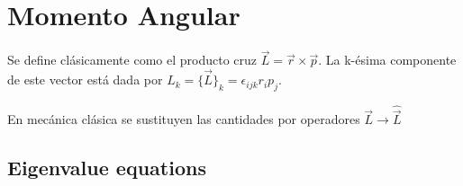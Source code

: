 \setchapterpreamble[u]{\margintoc}
\chapter{Momento Angular}

Se define clásicamente como el producto cruz $\vec L = \vec r \times \vec p$. La k-ésima componente de este vector está dada por $L_k = \{\vec L\}_k = \epsilon _{ijk} r_i p_j$.

En mecánica clásica se sustituyen las cantidades por operadores $\vec L \rightarrow \hat{\vec L}$ 




\section{Eigenvalue equations}






